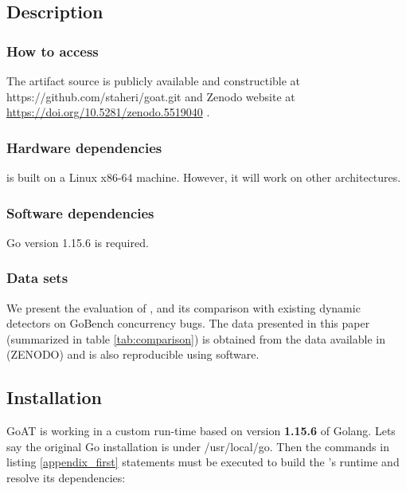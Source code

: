 {%
\subsection{Description}

\subsubsection{How to access}
The artifact source is publicly available and constructible at \textsf{https://github.com/staheri/goat.git} and Zenodo website at \href{https://doi.org/10.5281/zenodo.5519040}{https://doi.org/10.5281/zenodo.5519040} \cite{goat_artifact}.

\subsubsection{Hardware dependencies}
\goat is built on a Linux x86-64 machine. However, it will work on other architectures.

\subsubsection{Software dependencies}
Go version 1.15.6 is required.
\subsubsection{Data sets}
We present the evaluation of \goat, and its comparison with existing dynamic detectors on GoBench \cite{yuan-gobench-cgo21} concurrency bugs. The data presented in this paper (summarized in table \ref{tab:comparison}) is obtained from the data available in (ZENODO) and is also reproducible using \goat software.

\subsection{Installation}

GoAT is working in a custom run-time based on version \textbf{1.15.6} of Golang.
Lets say the original Go installation is under \textsf{/usr/local/go}. Then the commands in listing \ref{appendix_first} statements must be executed to build the \goat's runtime and resolve its dependencies:

}
